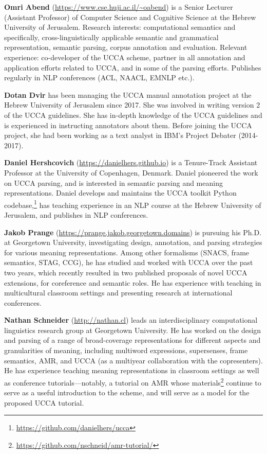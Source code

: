 \documentclass[11pt,a4paper,table]{article}
\begin{document}
\textbf{Omri Abend} (\url{https://www.cse.huji.ac.il/~oabend})
is a Senior Lecturer (Assistant Professor) of Computer Science and Cognitive Science
at the Hebrew University of Jerusalem.
Research interests:
computational semantics and specifically, cross-linguistically applicable
semantic and grammatical representation, semantic parsing, corpus annotation and evaluation.
Relevant experience: co-developer of the UCCA scheme, partner in all annotation and application efforts related to UCCA, and in some of the parsing efforts. Publishes regularly in NLP conferences (ACL, NAACL, EMNLP etc.).

\textbf{Dotan Dvir} has been managing the UCCA manual annotation project at the Hebrew University of Jerusalem since 2017. She was involved in writing version 2 of the UCCA guidelines. She has in-depth knowledge of the UCCA guidelines and is experienced in instructing annotators about them. Before joining the UCCA project, she had been working as a text analyst in IBM's Project Debater (2014-2017).

\textbf{Daniel Hershcovich} (\url{https://danielhers.github.io})
is a Tenure-Track Assistant Professor at the University of Copenhagen, Denmark.
Daniel pioneered the work on UCCA parsing, and
is interested in semantic parsing and meaning representations.
Daniel develops and maintains the UCCA toolkit Python codebase,\footnote{\url{https://github.com/danielhers/ucca}}
has teaching experience in an NLP course
at the Hebrew University of Jerusalem,
and publishes in NLP conferences.

\textbf{Jakob Prange} (\url{https://prange.jakob.georgetown.domains})
is pursuing his Ph.D. at Georgetown University, investigating design, annotation, and parsing strategies for various meaning representations.
Among other formalisms (SNACS, frame semantics, STAG, CCG), he has studied and worked with UCCA over the past two years, which recently resulted in two published proposals of novel UCCA extensions, for coreference and semantic roles.
He has experience with teaching in multicultural classroom settings and presenting research at international conferences.

\textbf{Nathan Schneider} (\url{http://nathan.cl})
leads an interdisciplinary computational linguistics research group at Georgetown University. 
He has worked on the design and parsing of a range of broad-coverage representations for different aspects and granularities of meaning, including multiword expressions, supersenses, frame semantics, AMR, and UCCA (as a multiyear collaboration with the copresenters). 
He has experience teaching meaning representations in classroom settings as well as conference tutorials---notably, a tutorial on AMR \citep{amrtutorial} whose materials\footnote{\url{https://github.com/nschneid/amr-tutorial/}} continue to serve as a useful introduction to the scheme, 
and will serve as a model for the proposed UCCA tutorial.



\end{document}
